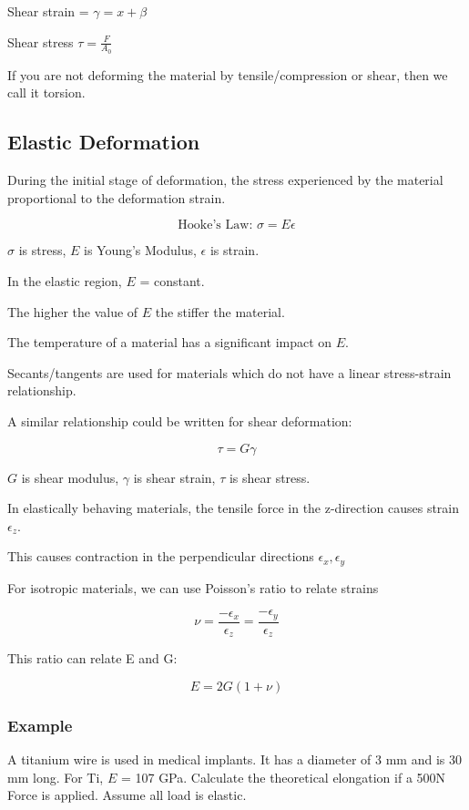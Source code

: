 \documentclass{article}
\begin{document}
Shear strain = $\gamma = x + \beta$

Shear stress $\tau = \frac{F}{A_0}$

If you are not deforming the material by tensile/compression or shear, then we call it torsion.

\subsection{Elastic Deformation}

During the initial stage of deformation, the stress experienced by the material proportional to the deformation strain.

\[\textrm{Hooke's Law: } \sigma = E \epsilon\]

$\sigma$ is stress, $E$ is Young's Modulus, $\epsilon$ is strain.
    
In the elastic region, $E$ = constant.

The higher the value of $E$ the stiffer the material. 

The temperature of a material has a significant impact on $E$.

Secants/tangents are used for materials which do not have a linear stress-strain relationship.

A similar relationship could be written for shear deformation:

\[\tau = G \gamma\]

$G$ is shear modulus, $\gamma$ is shear strain, $\tau$ is shear stress.

In elastically behaving materials, the tensile force in the z-direction causes strain $\epsilon_z$. 

This causes contraction in the perpendicular directions $\epsilon_x, \epsilon_y$

For isotropic materials, we can use Poisson's ratio to relate strains

\[\nu = \frac{-\epsilon_x}{\epsilon_z} = \frac{-\epsilon_y}{\epsilon_z}\]

This ratio can relate E and G:

\[E = 2G(1+\nu)\]

\subsubsection{Example}
A titanium wire is used in medical implants. It has a diameter of 3 mm and is 30 mm long. For Ti, $E$ = 107 GPa. Calculate the theoretical elongation if a 500N Force is applied. Assume all load is elastic.
\end{document}
